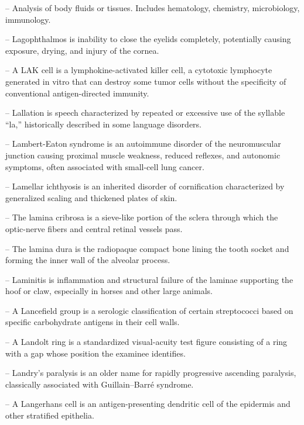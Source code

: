 -- Analysis of body fluids or tissues. Includes hematology, chemistry, microbiology, immunology.

-- Lagophthalmos is inability to close the eyelids completely, potentially causing exposure, drying, and injury of the cornea.

-- A LAK cell is a lymphokine-activated killer cell, a cytotoxic lymphocyte generated in vitro that can destroy some tumor cells without the specificity of conventional antigen-directed immunity.

-- Lallation is speech characterized by repeated or excessive use of the syllable ``la,'' historically described in some language disorders.

-- Lambert-Eaton syndrome is an autoimmune disorder of the neuromuscular junction causing proximal muscle weakness, reduced reflexes, and autonomic symptoms, often associated with small-cell lung cancer.

-- Lamellar ichthyosis is an inherited disorder of cornification characterized by generalized scaling and thickened plates of skin.

-- The lamina cribrosa is a sieve-like portion of the sclera through which the optic-nerve fibers and central retinal vessels pass.

-- The lamina dura is the radiopaque compact bone lining the tooth socket and forming the inner wall of the alveolar process.

-- Laminitis is inflammation and structural failure of the laminae supporting the hoof or claw, especially in horses and other large animals.

-- A Lancefield group is a serologic classification of certain streptococci based on specific carbohydrate antigens in their cell walls.

-- A Landolt ring is a standardized visual-acuity test figure consisting of a ring with a gap whose position the examinee identifies.

-- Landry's paralysis is an older name for rapidly progressive ascending paralysis, classically associated with Guillain--Barré syndrome.

-- A Langerhans cell is an antigen-presenting dendritic cell of the epidermis and other stratified epithelia.

